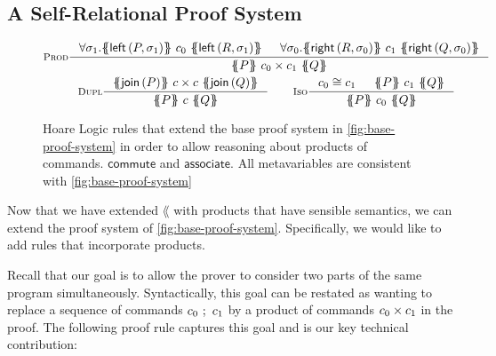 \documentclass[p.tex]{subfiles}
\begin{document}
\subsection{A Self-Relational Proof System}
\begin{figure}
\begin{spreadlines}{5pt}
\begin{gather*}
  \inference[\textsc{Prod}]{%
    \forall \sigma_1.
      \hoare{\aleft\left(P,\sigma_1\right)}
            {c_0}
            {\aleft\left(R,\sigma_1\right)}&
    \forall \sigma_0.
      \hoare{\aright\left(R,\sigma_0\right)}
            {c_1}
            {\aright\left(Q,\sigma_0\right)}
  }{%
    \hoare{P}{c_0 \times c_1}{Q}
  }
  \\
  \inference[\textsc{Dupl}]{%
    \hoare{\ajoin\left(P\right)}{\cprod{c}{c}}{\ajoin\left(Q\right)}
  }{%
    \hoare{P}{c}{Q}
  }
  \qquad
  \inference[\textsc{Iso}]{%
    c_0 \cong c_1&
    \hoare{P}{c_1}{Q}
  }{%
    \hoare{P}{c_0}{Q}
  }
\end{gather*}
\end{spreadlines}
\caption{%
  Hoare Logic rules that extend the base proof system in
  \cref{fig:base-proof-system} in order to allow reasoning about
  products of commands.
  $\textsf{commute}$ and $\textsf{associate}$.
  All metavariables are consistent with \cref{fig:base-proof-system}
}\label{fig:proof-rules}
\end{figure}

Now that we have extended $\lang$ with products that have sensible
semantics, we can extend the proof system of
\cref{fig:base-proof-system}.
Specifically, we would like to add rules that incorporate products.

Recall that our goal is to allow the prover to consider two parts of
the same program simultaneously. Syntactically, this goal can be
restated as wanting to replace a sequence of commands $c_0~;~c_1$
by a product of commands $c_0\times c_1$ in the proof.
The following proof rule captures this goal and is our key technical
contribution:
\end{document}
